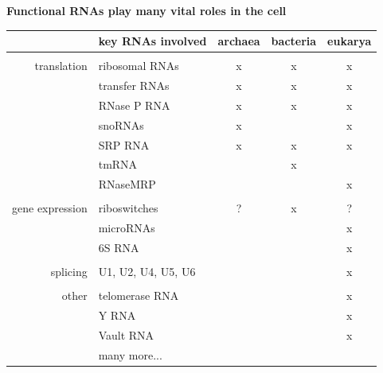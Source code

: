 \documentclass[landscape]{slides}
\begin{document}
\begin{slide}
\begin{center}
\textbf{Functional RNAs play many vital roles in the cell}
\end{center}
\medskip

\small
\begin{center}
\begin{tabular}{r|l|c|c|c}
 & key RNAs involved & archaea & bacteria & eukarya \\ \hline
 &  & & & \\ 
translation & ribosomal RNAs & x & x & x \\
            & transfer RNAs  & x & x & x \\
            & RNase P RNA    & x & x & x \\
            & snoRNAs        & x &   & x \\ 
            & SRP RNA        & x & x & x \\ 
            & tmRNA          &   & x &   \\ 
            & RNaseMRP       &   &   & x \\ 
 &  & & & \\ 
gene expression & riboswitches & ? & x & ? \\
                & microRNAs &  & & x \\
                & 6S RNA & & & x\\ 
 &  & & & \\ 
splicing        & U1, U2, U4, U5, U6 & & & x \\ 
 &  & & & \\ 
other           & telomerase RNA & & & x \\ 
                & Y RNA          & & & x \\
                & Vault RNA      & & & x \\
                & many more... & & & \\ 
\end{tabular}
\end{center}

\vfill
\end{slide}
\end{document}
